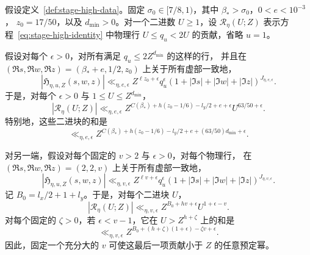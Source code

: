 \begin{lemma}[外部行范数]
\label{lem:outer-row-tails}
假设定义~\ref{def:stage-high-data}。固定
$\sigma_0\in[7/8,1)$，其中 $\beta_*>\sigma_0$，$0<e<10^{-3}$，
$z_0=17/50$，以及 $d_{\min}>0$。对一个二进数 $U\ge1$，设
$\mathscr R_\eta(U;Z)$ 表示方程~\eqref{eq:stage-high-identity} 中物理行
$U\le q_u<2U$ 的贡献，省略 $u=1$。

假设对每个 $\epsilon>0$，对所有满足 $q_u\le2Z^{d_{\min}}$ 的这样的行，
并且在 $(\Re s,\Re w,\Re z)=(\beta_*+e,1/2,z_0)$ 上关于所有虚部一致地，
\begin{equation}
 |\mathfrak H_{\eta,u,Z}(s,w,z)|
 \ll_{\eta,e,\epsilon}
 Z^{\ell z_0+\epsilon}q_u^\epsilon
 (1+|\Im s|+|\Im w|+|\Im z|)^{J_{\eta,e,\epsilon}}.
 \label{eq:small-correction-bound}
\end{equation}
于是，对每个 $\epsilon>0$ 与 $1\le U\le Z^{d_{\min}}$，
\begin{equation}
 |\mathscr R_\eta(U;Z)|
 \ll_{\eta,e,\epsilon}
 Z^{C(\beta_*)+h(z_0-1/6)-l_y/2+e+\epsilon}
       U^{63/50+\epsilon}.
 \label{eq:small-row-bound}
\end{equation}
特别地，这些二进块的和是
\begin{equation}
 \ll_{\eta,e,\epsilon}
 Z^{C(\beta_*)+h(z_0-1/6)-l_y/2+e+(63/50)d_{\min}+\epsilon}.
 \label{eq:small-row-sum}
\end{equation}

对另一端，假设对每个固定的 $v>2$ 与 $\epsilon>0$，对每个物理行，
在 $(\Re s,\Re w,\Re z)=(2,2,v)$ 上关于所有虚部一致地，
\begin{equation}
 |\mathfrak H_{\eta,u,Z}(s,w,z)|
 \ll_{\eta,v,\epsilon}
 Z^{\ell v+\epsilon}q_u^\epsilon
 (1+|\Im s|+|\Im w|+|\Im z|)^{J_{\eta,v,\epsilon}}.
 \label{eq:large-correction-bound}
\end{equation}
记 $B_0=l_x/2+1+l_y$。于是，对每个二进块 $U$，
\begin{equation}
 |\mathscr R_\eta(U;Z)|
 \ll_{\eta,v,\epsilon}Z^{B_0+hv+\epsilon}U^{1+\epsilon-v}.
 \label{eq:large-row-bound}
\end{equation}
对每个固定的 $\zeta>0$，若 $\epsilon<v-1$，它在 $U>Z^{h+\zeta}$ 上的和是
\begin{equation}
 \ll_{\eta,v,\epsilon}
 Z^{B_0+(h+\zeta)(1+\epsilon)-\zeta v+\epsilon}.
 \label{eq:large-row-sum}
\end{equation}
因此，固定一个充分大的 $v$ 可使这最后一项贡献小于 $Z$ 的任意预定幂。
\end{lemma}


